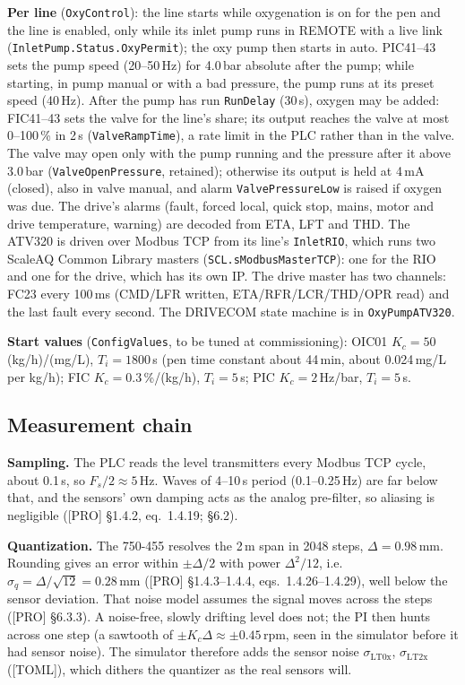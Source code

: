 \documentclass[11pt]{article}
\begin{document}
\textbf{Per line} (\texttt{OxyControl}): the line starts while oxygenation is on for the pen and the
line is enabled, only while its inlet pump runs in REMOTE with a live link
(\texttt{InletPump.Status.OxyPermit}); the oxy
pump then starts in auto. PIC41--43 sets the pump speed (20--50\,Hz) for 4.0\,bar absolute after the
pump; while starting, in pump manual or with a bad pressure, the pump runs at its preset speed
(40\,Hz). After the pump has run \texttt{RunDelay} (30\,s), oxygen may be added: FIC41--43 sets the
valve for the line's share; its output reaches the valve at most 0--100\,\% in 2\,s
(\texttt{ValveRampTime}), a rate limit in the PLC rather than in the valve. The valve may open only
with the pump running and the pressure after it above 3.0\,bar (\texttt{ValveOpenPressure}, retained);
otherwise its output is held at 4\,mA (closed), also in valve manual, and alarm
\texttt{ValvePressureLow} is raised if oxygen was due. The drive's alarms (fault, forced local,
quick stop, mains, motor and drive temperature, warning) are decoded from ETA, LFT and THD. The ATV320 is driven over
Modbus TCP from its line's \texttt{InletRIO}, which runs two ScaleAQ Common Library masters
(\texttt{SCL.sModbusMasterTCP}): one for the RIO and one for the drive, which has its own IP. The drive
master has two channels: FC23 every 100\,ms (CMD/LFR written, ETA/RFR/LCR/THD/OPR read) and the last
fault every second. The DRIVECOM state machine is in \texttt{OxyPumpATV320}.

\textbf{Start values} (\texttt{ConfigValues}, to be tuned at commissioning): OIC01 $K_c = 50$
(kg/h)/(mg/L), $T_i = 1800$\,s (pen time constant about 44\,min, about 0.024\,mg/L per kg/h);
FIC $K_c = 0.3$\,\%/(kg/h), $T_i = 5$\,s; PIC $K_c = 2$\,Hz/bar, $T_i = 5$\,s.

\subsection{Measurement chain}\label{sec:filter}
\textbf{Sampling.} The PLC reads the level transmitters every Modbus TCP cycle, about 0.1\,s, so
$F_s/2 \approx 5$\,Hz. Waves of 4--10\,s period (0.1--0.25\,Hz) are far below that, and the
sensors' own damping acts as the analog pre-filter, so aliasing is negligible ([PRO] §1.4.2,
eq.~1.4.19; §6.2).

\textbf{Quantization.} The 750-455 resolves the 2\,m span in 2048 steps,
$\Delta = 0.98$\,mm. Rounding gives an error within $\pm\Delta/2$ with power $\Delta^2/12$, i.e.\
$\sigma_q = \Delta/\sqrt{12} = 0.28$\,mm ([PRO] §1.4.3--1.4.4, eqs.~1.4.26--1.4.29), well below
the sensor deviation. That noise model assumes the signal moves across the steps
([PRO] §6.3.3). A noise-free, slowly drifting level does not; the PI then hunts across one step
(a sawtooth of $\pm K_c\Delta \approx \pm0.45$\,rpm, seen in the simulator before it had sensor
noise). The simulator therefore adds the sensor noise $\sigma_\text{LT0x}$, $\sigma_\text{LT2x}$
([TOML]), which dithers the quantizer as the real sensors will.
\end{document}
